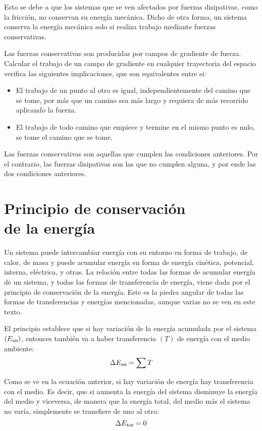 \documentclass[a5paper,12pt,twoside]{book}
\begin{document}
Esto se debe a que los sistemas que se ven afectados por fuerzas disipativas, como la fricción, no conservan su energía mecánica. Dicho de otra forma, un sistema conserva la energía mecánica solo si realiza trabajo mediante fuerzas conservativas.

Las fuerzas conservativas son producidas por campos de gradiente de fuerza. Calcular el trabajo de un campo de gradiente en cualquier trayectoria del espacio verifica las siguientes implicaciones, que son equivalentes entre si:
\begin{itemize}
    \item {} El trabajo de un punto al otro es igual, independientemente del camino que se tome, por más que un camino sea más largo y requiera de más recorrido aplicando la fuerza.
    
    \item {} El trabajo de todo camino que empiece y termine en el mismo punto es nulo, se tome el camino que se tome.
\end{itemize}

Las fuerzas conservativas son aquellas que cumplen las condiciones anteriores. Por el contrario, las fuerzas disipativas son las que no cumplen alguna, y por ende las dos condiciones anteriores.


\section[Principio de conservación de la energía]{Principio de conservación \\ de la energía}

Un sistema puede intercambiar energía con su entorno en forma de trabajo, de calor, de masa y puede acumular energía en forma de energía cinética, potencial, interna, eléctrica, y otras. La relación entre todas las formas de acumular energía de un sistema, y todas las formas de transferencia de energía, viene dada por el principio de conservación de la energía. Este es la piedra angular de todas las formas de transferencias y energías mencionadas, aunque varias no se ven en este texto.

El principio establece que si hay variación de la energía acumulada por el sistema $({{E}_\textsl{{sis}}})$, entonces también va a haber transferencia $(T)$ de energía con el medio ambiente:
\[ \Delta {{E}_\textsl{{sis}}} = \sum T \]

Como se ve en la ecuación anterior, si hay variación de energía hay transferencia con el medio.
Es decir, que si aumenta la energía del sistema disminuye la energía del medio y viceversa, de manera que la energía total, del medio más el sistema no varía, simplemente se transfiere de uno al otro:
\[ \Delta {{E}_\textsl{{tot}}} = 0 \]
\end{document}
